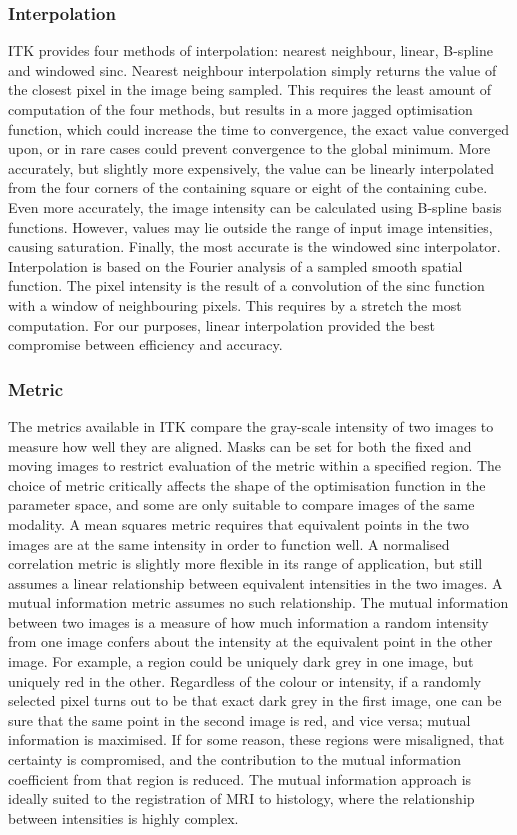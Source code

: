     
    \subsubsection{Interpolation} %
    \label{sub:interpolation}
      ITK provides four methods of interpolation: nearest neighbour, linear, B-spline and windowed sinc. Nearest neighbour interpolation simply returns the value of the closest pixel in the image being sampled. This requires the least amount of computation of the four methods, but results in a more jagged optimisation function, which could increase the time to convergence, the exact value converged upon, or in rare cases could prevent convergence to the global minimum. More accurately, but slightly more expensively, the value can be linearly interpolated from the four corners of the containing square or eight of the containing cube. Even more accurately, the image intensity can be calculated using B-spline basis functions. However, values may lie outside the range of input image intensities, causing saturation. Finally, the most accurate is the windowed sinc interpolator. Interpolation is based on the Fourier analysis of a sampled smooth spatial function. The pixel intensity is the result of a convolution of the sinc function with a window of neighbouring pixels. This requires by a stretch the most computation. For our purposes, linear interpolation provided the best compromise between efficiency and accuracy.
    
    \subsubsection{Metric} %
    \label{sub:metric}
      The metrics available in ITK compare the gray-scale intensity of two images to measure how well they are aligned. Masks can be set for both the fixed and moving images to restrict evaluation of the metric within a specified region. The choice of metric critically affects the shape of the optimisation function in the parameter space, and some are only suitable to compare images of the same modality. A mean squares metric requires that equivalent points in the two images are at the same intensity in order to function well. A normalised correlation metric is slightly more flexible in its range of application, but still assumes a linear relationship between equivalent intensities in the two images. A mutual information metric assumes no such relationship. The mutual information between two images is a measure of how much information a random intensity from one image confers about the intensity at the equivalent point in the other image. For example, a region could be uniquely dark grey in one image, but uniquely red in the other. Regardless of the colour or intensity, if a randomly selected pixel turns out to be that exact dark grey in the first image, one can be sure that the same point in the second image is red, and vice versa; mutual information is maximised. If for some reason, these regions were misaligned, that certainty is compromised, and the contribution to the mutual information coefficient from that region is reduced. The mutual information approach is ideally suited to the registration of MRI to histology, where the relationship between intensities is highly complex.
    
